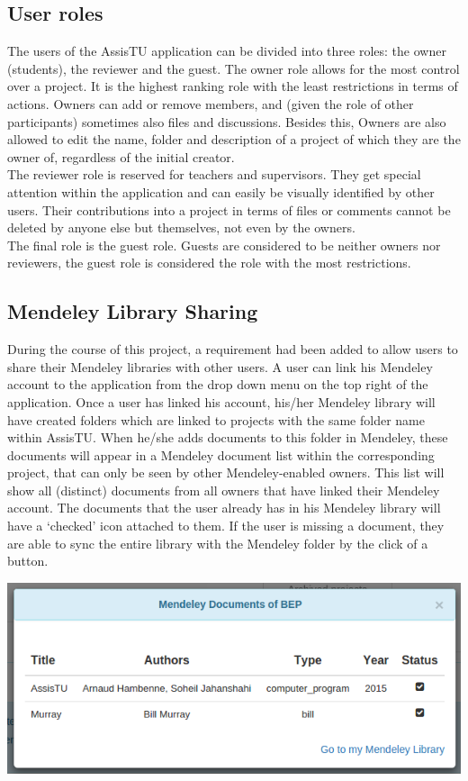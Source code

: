 \subsection{User roles}
The users of the AssisTU application can be divided into three roles: the owner (students), the reviewer and the guest. The owner role allows for the most control over a project. It is the highest ranking role with the least restrictions in terms of actions. Owners can add or remove members, and (given the role of other participants) sometimes also files and discussions. Besides this, Owners are also allowed to edit the name, folder and description of a project of which they are the owner of, regardless of the initial creator. \\
The reviewer role is reserved for teachers and supervisors. They get special attention within the application and can easily be visually identified by other users. Their contributions into a project in terms of files or comments cannot be deleted by anyone else but themselves, not even by the owners. \\
The final role is the guest role. Guests are considered to be neither owners nor reviewers, the guest role is considered the role with the most restrictions.

\newpage

\subsection{Mendeley Library Sharing}
During the course of this project, a requirement had been added to allow users to share their Mendeley libraries with other users. A user can link his Mendeley account to the application from the drop down menu on the top right of the application. Once a user has linked his account, his/her Mendeley library will have created folders which are linked to projects with the same folder name within AssisTU. When he/she adds documents to this folder in Mendeley, these documents will appear in a Mendeley document list within the corresponding project, that can only be seen by other Mendeley-enabled owners. This list will show all (distinct) documents from all owners that have linked their Mendeley account. The documents that the user already has in his Mendeley library will have a `checked' icon attached to them. If the user is missing a document, they are able to sync the entire library with the Mendeley folder by the click of a button.

\begin{center}
\includegraphics[scale=0.5]{./img/mendeley.png}
\end{center}

